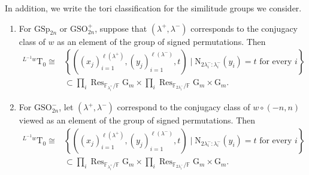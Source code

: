 \documentclass[12pt, reqno]{amsart}
\theoremstyle{definition}
\theoremstyle{definition}
\theoremstyle{definition}
\newcommand{\lengthof}{\ell}
\newcommand{\GSO}{\mathrm{GSO}}
\newcommand{\GSp}{\mathrm{GSp}}
\newcommand{\FieldNorm}[2]{\mathrm{N}_{#1:#2}}
\newcommand{\finiteField}{\mathbb{F}}
\newcommand{\finiteFieldExtension}[1]{\finiteField_{#1}}
\newcommand{\restrictionOfScalars}[3]{\operatorname{Res}_{#1 \slash #2}{#3}}
\newcommand{\multiplcativeScheme}{\algebraicGroup{G}_m}
\newcommand{\algebraicGroup}[1]{\boldsymbol{\mathrm{#1}}}
\begin{document}
    
    In addition, we write the tori classification for the similitude groups we consider.
	\begin{enumerate}
		\item For $\algebraicGroup{\GSp}_{2n}$ or $\algebraicGroup{\GSO}_{2n}^+$, suppose that $(\lambda^+,\lambda^-)$ corresponds to the conjugacy class of $w$ as an element of the group of signed permutations. Then
			\begin{align*}
				^{L^{-1}w}\algebraicGroup{T}_0 \cong& \left\{\left(\left(x_j\right)_{i=1}^{\lengthof\left(\lambda^+\right)},\left(y_j\right)_{i=1}^{\lengthof\left(\lambda^-\right)},t\right) \mid \FieldNorm{2\lambda_i^-}{\lambda_i^-}(y_i) = t \text{ for every } i\right\} \\
				& \subset \prod_{i} \restrictionOfScalars{\finiteFieldExtension{\lambda^+_i}}{\finiteField}{\multiplcativeScheme} \times \prod_{i} \restrictionOfScalars{\finiteFieldExtension{2\lambda^-_i}}{\finiteField}{\multiplcativeScheme}  \times \multiplcativeScheme.
			\end{align*}
			\item For $\algebraicGroup{\GSO}_{2n}^-$, let $(\lambda^+,\lambda^-)$ correspond to the conjugacy class of $w\circ (-n,n)$ viewed as an element of the group of signed permutations. Then
			\begin{align*}
				^{L^{-1}w}\algebraicGroup{T}_0 \cong& \left\{\left(\left(x_j\right)_{i=1}^{\lengthof\left(\lambda^+\right)},\left(y_j\right)_{i=1}^{\lengthof\left(\lambda^-\right)},t\right) \mid \FieldNorm{2\lambda_i^-}{\lambda_i^-}(y_i) = t \text{ for every } i\right\} \\
				& \subset \prod_{i} \restrictionOfScalars{\finiteFieldExtension{\lambda^+_i}}{\finiteField}{\multiplcativeScheme} \times \prod_{i} \restrictionOfScalars{\finiteFieldExtension{2\lambda^-_i}}{\finiteField}{\multiplcativeScheme}  \times \multiplcativeScheme.
			\end{align*}
	\end{enumerate}
\end{document}
